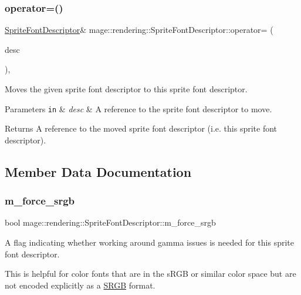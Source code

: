 \subsubsection{\texorpdfstring{operator=()}{operator=()}\hspace{0.1cm}{\footnotesize\ttfamily [2/2]}}
{\footnotesize\ttfamily \mbox{\hyperlink{classmage_1_1rendering_1_1_sprite_font_descriptor}{Sprite\+Font\+Descriptor}}\& mage\+::rendering\+::\+Sprite\+Font\+Descriptor\+::operator= (\begin{DoxyParamCaption}\item[{\mbox{\hyperlink{classmage_1_1rendering_1_1_sprite_font_descriptor}{Sprite\+Font\+Descriptor}} \&\&}]{desc }\end{DoxyParamCaption})\hspace{0.3cm}{\ttfamily [default]}, {\ttfamily [noexcept]}}

Moves the given sprite font descriptor to this sprite font descriptor.


\begin{DoxyParams}[1]{Parameters}
\mbox{\tt in}  & {\em desc} & A reference to the sprite font descriptor to move. \\
\hline
\end{DoxyParams}
\begin{DoxyReturn}{Returns}
A reference to the moved sprite font descriptor (i.\+e. this sprite font descriptor). 
\end{DoxyReturn}


\subsection{Member Data Documentation}
\mbox{\label{classmage_1_1rendering_1_1_sprite_font_descriptor_abfb5c7d28df254c483c489be55736c76}} 
\subsubsection{\texorpdfstring{m\+\_\+force\+\_\+srgb}{m\_force\_srgb}}
{\footnotesize\ttfamily bool mage\+::rendering\+::\+Sprite\+Font\+Descriptor\+::m\+\_\+force\+\_\+srgb\hspace{0.3cm}{\ttfamily [private]}}

A flag indicating whether working around gamma issues is needed for this sprite font descriptor.

This is helpful for color fonts that are in the s\+R\+GB or similar color space but are not encoded explicitly as a \mbox{\hyperlink{structmage_1_1_s_r_g_b}{S\+R\+GB}} format. 